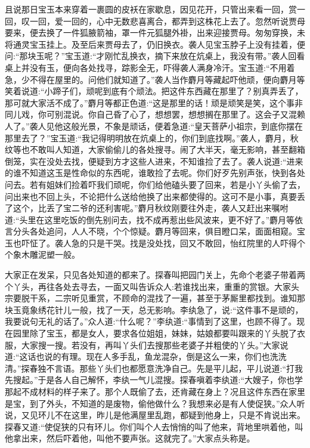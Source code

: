 \begin{parag}
    且说那日宝玉本来穿着一裹圆的皮袄在家歇息，因见花开，只管出来看一回，赏一回，叹一回，爱一回的，心中无数悲喜离合，都弄到这株花上去了。忽然听说贾母要来，便去换了一件狐腋箭袖，罩一件元狐腿外褂，出来迎接贾母。匆匆穿换，未将通灵宝玉挂上。及至后来贾母去了，仍旧换衣。袭人见宝玉脖子上没有挂着，便问:“那块玉呢？”宝玉道:“才刚忙乱换衣，摘下来放在炕桌上，我没有带。”袭人回看桌上并没有玉，便向各处找寻，踪影全无，吓得袭人满身冷汗。宝玉道:“不用着急，少不得在屋里的。问他们就知道了。”袭人当作麝月等藏起吓他顽，便向麝月等笑着说道:“小蹄子们，顽呢到底有个顽法。把这件东西藏在那里了？别真弄丢了，那可就大家活不成了。”麝月等都正色道:“这是那里的话！顽是顽笑是笑，这个事非同儿戏，你可别混说。你自己昏了心了，想想罢，想想搁在那里了。这会子又混赖人了。”袭人见他这般光景，不象是顽话，便着急道:“皇天菩萨小祖宗，到底你摆在那里去了？”宝玉道:“我记得明明放在炕桌上的，你们到底找啊。”袭人，麝月，秋纹等也不敢叫人知道，大家偷偷儿的各处搜寻。闹了大半天，毫无影响，甚至翻箱倒笼，实在没处去找，便疑到方才这些人进来，不知谁捡了去了。袭人说道:“进来的谁不知道这玉是性命似的东西呢，谁敢捡了去呢。你们好歹先别声张，快到各处问去。若有姐妹们捡着吓我们顽呢，你们给他磕头要了回来，若是小丫头偷了去，问出来也不回上头，不论把什么送给他换了出来都使得的。这可不是小事，真要丢了这个，比丢了宝二爷的还利害呢。”麝月秋纹刚要往外走，袭人又赶出来嘱咐道:“头里在这里吃饭的倒先别问去，找不成再惹出些风波来，更不好了。”麝月等依言分头各处追问，人人不晓，个个惊疑。麝月等回来，俱目瞪口呆，面面相窥。宝玉也吓怔了。袭人急的只是干哭。找是没处找，回又不敢回，怡红院里的人吓得个个象木雕泥塑一般。
\end{parag}


\begin{parag}
    大家正在发呆，只见各处知道的都来了。探春叫把园门关上，先命个老婆子带着两个丫头，再往各处去寻去，一面又叫告诉众人:若谁找出来，重重的赏银。大家头宗要脱干系，二宗听见重赏，不顾命的混找了一遍，甚至于茅厮里都找到。谁知那块玉竟象绣花针儿一般，找了一天，总无影响。李纨急了，说:“这件事不是顽的，我要说句无礼的话了。”众人道:“什么呢？”李纨道:“事情到了这里，也顾不得了。现在园里除了宝玉，都是女人，要求各位姐姐，妹妹，姑娘都要叫跟来的丫头脱了衣服，大家搜一搜。若没有，再叫丫头们去搜那些老婆子并粗使的丫头。”大家说道:“这话也说的有理。现在人多手乱，鱼龙混杂，倒是这么一来，你们也洗洗清。”探春独不言语。那些丫头们也都愿意洗净自己。先是平儿起，平儿说道:“打我先搜起。”于是各人自己解怀，李纨一气儿混搜。探春嗔着李纨道:“大嫂子，你也学那起不成材料的样子来了。那个人既偷了去，还肯藏在身上？况且这件东西在家里是宝，到了外头，不知道的是废物，偷他做什么？我想来必是有人使促狭。”众人听说，又见环儿不在这里，昨儿是他满屋里乱跑，都疑到他身上，只是不肯说出来。探春又道:“使促狭的只有环儿。你们叫个人去悄悄的叫了他来，背地里哄着他，叫他拿出来，然后吓着他，叫他不要声张。这就完了。”大家点头称是。
\end{parag}


